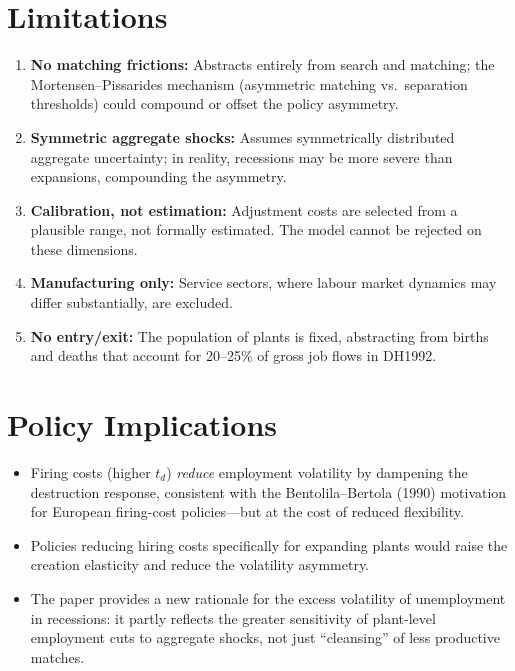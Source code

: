 \section{Limitations}

\begin{enumerate}
  \item \textbf{No matching frictions:} Abstracts entirely from search and
    matching; the Mortensen--Pissarides mechanism (asymmetric matching vs.\
    separation thresholds) could compound or offset the policy asymmetry.
  \item \textbf{Symmetric aggregate shocks:} Assumes symmetrically distributed
    aggregate uncertainty; in reality, recessions may be more severe than
    expansions, compounding the asymmetry.
  \item \textbf{Calibration, not estimation:} Adjustment costs are selected
    from a plausible range, not formally estimated. The model cannot be
    rejected on these dimensions.
  \item \textbf{Manufacturing only:} Service sectors, where labour market
    dynamics may differ substantially, are excluded.
  \item \textbf{No entry/exit:} The population of plants is fixed, abstracting
    from births and deaths that account for 20--25\% of gross job flows in
    DH1992.
\end{enumerate}

\section{Policy Implications}

\begin{itemize}
  \item Firing costs (higher $t_d$) \emph{reduce} employment volatility by
    dampening the destruction response, consistent with the Bentolila--Bertola
    (1990) motivation for European firing-cost policies---but at the cost of
    reduced flexibility.
  \item Policies reducing hiring costs specifically for expanding plants would
    raise the creation elasticity and reduce the volatility asymmetry.
  \item The paper provides a new rationale for the excess volatility of
    unemployment in recessions: it partly reflects the greater sensitivity of
    plant-level employment cuts to aggregate shocks, not just ``cleansing''
    of less productive matches.
\end{itemize}

